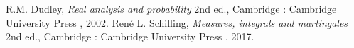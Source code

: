 \documentclass[12pt,a4paper]{jsarticle}
\begin{document}
\begin{thebibliography}{99}
    R.M. Dudley,
    \textit{Real analysis and probability} 2nd ed.,
    Cambridge : Cambridge University Press , 2002.
    René L. Schilling,
    \textit{Measures, integrals and martingales} 2nd ed.,
    Cambridge : Cambridge University Press , 2017.
\end{thebibliography}
\end{document}

